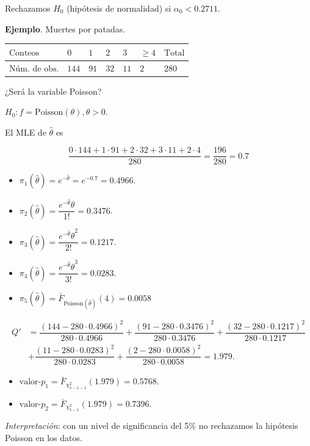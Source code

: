 \documentclass[
  12pt,
]{book}
\begin{document}
Rechazamos \(H_0\) (hipótesis de normalidad) si \(\alpha_0<0.2711\).

\textbf{Ejemplo}. Muertes por patadas.

\begin{longtable}[]{@{}lllllll@{}}
\toprule
\(\text{Conteos}\) & \(0\) & \(1\) & \(2\) & \(3\) & \(\ge 4\) & \(\text{Total}\)\tabularnewline
\midrule
\endhead
\(\text{Núm. de obs.}\) & \(144\) & \(91\) & \(32\) & \(11\) & \(2\) & \(280\)\tabularnewline
\bottomrule
\end{longtable}

¿Será la variable Poisson?

\(H_0: f = \text{Poisson}(\theta), \theta>0\).

El MLE de \(\hat\theta\) es

\[\dfrac{0\cdot 144+1\cdot91+2\cdot32+3\cdot 11+2\cdot4}{280} = \dfrac{196}{280} = 0.7\]

\begin{itemize}
\item
  \(\pi_1(\hat\theta) = e^{-\hat\theta} = e^{-0.7}=0.4966\).
\item
  \(\pi_2(\hat\theta) = \dfrac{e^{-\hat\theta}\hat\theta}{1!} = 0.3476\).
\item
  \(\pi_3(\hat\theta) = \dfrac{e^{-\hat\theta}\hat\theta^2}{2!} = 0.1217\).
\item
  \(\pi_4(\hat\theta) = \dfrac{e^{-\hat\theta}\hat\theta^3}{3!} = 0.0283\).
\item
  \(\pi_5(\hat\theta) = \bar F_{\text{Poisson}(\hat\theta)}(4) = 0.0058\)
\end{itemize}

\begin{align*}
Q' & = \dfrac{(144-280\cdot0.4966)^2}{280\cdot0.4966}+\dfrac{(91-280\cdot0.3476)^2}{280\cdot0.3476}+\dfrac{(32-280\cdot0.1217)^2}{280\cdot0.1217}\\
& +\dfrac{(11-280\cdot0.0283)^2}{280\cdot0.0283} +\dfrac{(2-280\cdot0.0058)^2}{280\cdot0.0058} = 1.979.
\end{align*}

\begin{itemize}
\item
  \(\text{valor-}p_1 =\bar F_{\chi^2_{5-1-1}}(1.979) = 0.5768\).
\item
  \(\text{valor-}p_2 = \bar F_{\chi^2_{5-1}}(1.979) = 0.7396\).
\end{itemize}

\emph{Interpretación}: con un nivel de significancia del 5\% no rechazamos la hipótesis Poisson en los datos.
\end{document}
